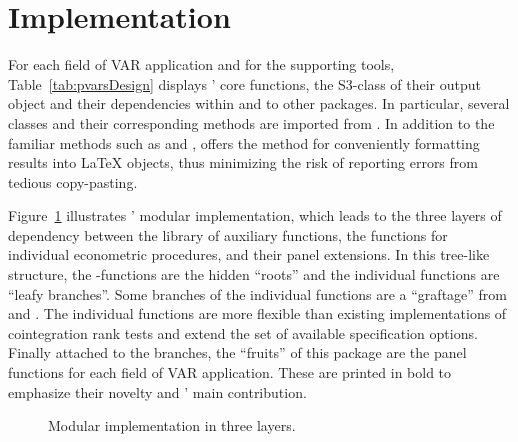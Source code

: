 
\section{Implementation} \label{sec:Implementation}
For each field of VAR application and for the supporting tools, Table~\ref{tab:pvarsDesign} displays ' core functions, the S3-class of their output object and their dependencies within and to other packages. In particular, several classes and their corresponding methods are imported from . In addition to the familiar methods such as  and ,  offers the method  for conveniently formatting  results into LaTeX objects, thus minimizing the risk of reporting errors from tedious copy-pasting. 
\begin{table}[ht]	%
	\centering
	\caption{Package design of .}
	\resizebox{\textwidth}{!}{
		}
	\label{tab:pvarsDesign}		
\end{table}

Figure~\ref{fig:Modules} illustrates ' modular implementation, which leads to the three layers of dependency between the library of auxiliary functions, the functions for individual econometric procedures, and their panel extensions. In this tree-like structure, the -functions are the hidden ``roots'' and the individual functions are ``leafy branches''. Some branches of the individual \mbox{} functions are a ``graftage'' from  and . The individual \mbox{} functions are more flexible than existing implementations of cointegration rank tests and extend the set of available specification options. Finally attached to the branches, the ``fruits'' of this package are the panel functions for each field of VAR application. These are printed in bold to emphasize their novelty and ' main contribution.
\begin{figure}[ht] %
	\centering
	\caption{Modular implementation in three layers.}
	\resizebox{0.75\textwidth}{!}{
		}
	\label{fig:Modules}
\end{figure}

